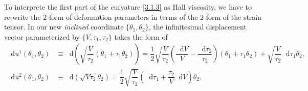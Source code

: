 \documentclass[10pt,nofootinbib,letterpaper]{revtex4}
\newcommand*\dd{\mathop{}\!\mathrm{d}}
\begin{document}
		To interprete the first part of the curvature \eqref{3.1.3} as Hall viscosity, we have to re-write the $2$-form of deformation parameters in terms of the $2$-form of the strain tensor. In our new \emph{inclined} coordinate $\{\theta_1,\theta_2\}$, the infinitesimal displacement vector parameterized by $\{V,\tau_1,\tau_2\}$ takes the form of
		\begin{align*}
			\dd u^1(\theta_1,\theta_2)&\equiv\dd \left(\sqrt{\dfrac{V}{\tau_2}}(\theta_1+\tau_1\theta_2)\right) =\dfrac{1}{2}\sqrt{\dfrac{V}{\tau_2}}\left(\dfrac{\dd V}{V}-\dfrac{\dd\tau_2}{\tau_2}\right)(\theta_1+\tau_1\theta_2)+\sqrt{\dfrac{V}{\tau_2}}\dd\tau_1\theta_2,\\
			\dd u^2(\theta_1,\theta_2)&\equiv\dd \left(\sqrt{V\tau_2}\theta_2\right)=\dfrac{1}{2}\sqrt{\dfrac{V}{\tau_2}}\left(\dd\tau_1+\dfrac{\tau_2}{V}\dd V\right)\theta_2.
		\end{align*}
\end{document}
